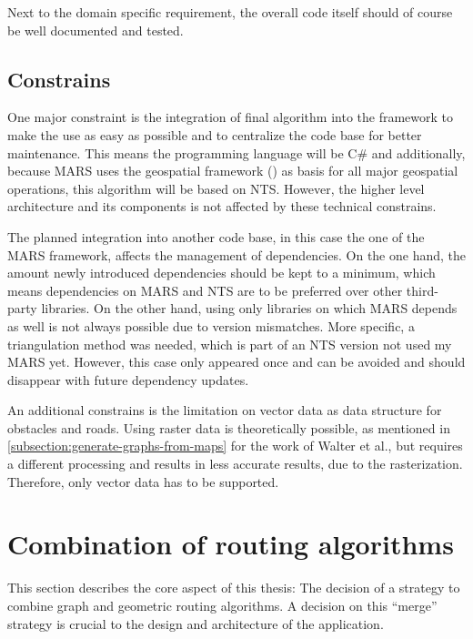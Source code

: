 		Next to the domain specific requirement, the overall code itself should of course be well documented and tested.
	
	\subsection{Constrains}
	\label{subsec:constrains}
		
		One major constraint is the integration of final algorithm into the  framework to make the use as easy as possible and to centralize the code base for better maintenance.
		This means the programming language will be C\# and additionally, because MARS uses the geospatial framework  () as basis for all major geospatial operations, this algorithm will be based on NTS.
		However, the higher level architecture and its components is not affected by these technical constrains.
		
		The planned integration into another code base, in this case the one of the MARS framework, affects the management of dependencies.
		On the one hand, the amount newly introduced dependencies should be kept to a minimum, which means dependencies on MARS and NTS are to be preferred over other third-party libraries.
		On the other hand, using only libraries on which MARS depends as well is not always possible due to version mismatches.
		More specific, a triangulation method was needed, which is part of an NTS version not used my MARS yet.
		However, this case only appeared once and can be avoided and should disappear with future dependency updates.
		
		An additional constrains is the limitation on vector data as data structure for obstacles and roads.
		Using raster data is theoretically possible, as mentioned in \cref{subsection:generate-graphs-from-maps} for the work of Walter et al., but requires a different processing and results in less accurate results, due to the rasterization.
		Therefore, only vector data has to be supported.
	
\section{Combination of routing algorithms}
\label{sec:combining-routing-algorithms}

	This section describes the core aspect of this thesis:
	The decision of a strategy to combine graph and geometric routing algorithms.
	A decision on this \enquote{merge} strategy is crucial to the design and architecture of the application.
	
